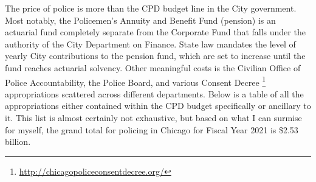 \documentclass[
]{article}
\begin{document}
\setlength{\parindent}{5ex}

The price of police is more than the CPD budget line in the City
government. Most notably, the Policemen's Annuity and Benefit Fund
(pension) is an actuarial fund completely separate from the Corporate
Fund that falls under the authority of the City Department on Finance.
State law mandates the level of yearly City contributions to the pension
fund, which are set to increase until the fund reaches actuarial
solvency. Other meaningful costs is the Civilian Office of Police
Accountability, the Police Board, and various Consent Decree \footnote{\url{http://chicagopoliceconsentdecree.org/}}
appropriations scattered across different departments. Below is a table
of all the appropriations either contained within the CPD budget
specifically or ancillary to it. This list is almost certainly not
exhaustive, but based on what I can surmise for myself, the grand total
for policing in Chicago for Fiscal Year 2021 is \$2.53 billion.
\end{document}
